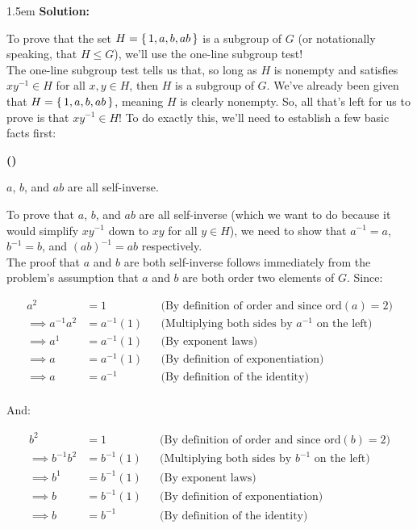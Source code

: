 \documentclass{article}
\newenvironment{solution}{
	\vspace{.5em}
	\par
	\begin{adjustwidth}{1.5em}{}
	\textbf{{Solution:}}
	\par
	\vspace{.5em}
}{
	\vspace{1em}
	\end{adjustwidth}
	\setcounter{step}{0}
	\newpage
}
\newcounter{step}
\renewcommand{\thestep}{\Roman{step}}
\newenvironment{step}{
	\refstepcounter{step}
	\vspace{1em}\par\noindent
	\ignorespaces\noindent\textbf{(\thestep)}
	\ignorespaces
}{
	\par
	\vspace{1.5em}
}
\newcounter{problem}
\newcommand{\ord}[1]{\text{ord}({#1})}
\begin{document}
\begin{solution}
	To prove that the set $H = \set{1, a, b, ab}$ is a subgroup of $G$ (or notationally speaking, that $H \le G$), we'll use the one-line subgroup test! \\

	The one-line subgroup test tells us that, so long as $H$ is nonempty and satisfies $xy^{-1} \in H$ for all $x, y \in H$, then $H$ is a subgroup of $G$. We've already been given that $H = \set{1, a, b, ab}$, meaning $H$ is clearly nonempty. So, all that's left for us to prove is that $xy^{-1} \in H$! To do exactly this, we'll need to establish a few basic facts first:

	\begin{step}
		$a$, $b$, and $ab$ are all self-inverse.
	\end{step}

	To prove that $a$, $b$, and $ab$ are all self-inverse (which we want to do because it would simplify $xy^{-1}$ down to $xy$ for all $y \in H$), we need to show that $a^{-1} = a$, $b^{-1} = b$, and $(ab)^{-1} = ab$ respectively. \\

	The proof that $a$ and $b$ are both self-inverse follows immediately from the problem's assumption that $a$ and $b$ are both order two elements of $G$. Since:

	\begin{align*}
		a^{2} &= 1 &&\text{(By definition of order and since $\ord{a} = 2$)} \\
		\implies a^{-1}a^{2} &= a^{-1}(1) &&\text{(Multiplying both sides by $a^{-1}$ on the left)} \\
		\implies a^{1} &= a^{-1}(1) &&\text{(By exponent laws)} \\
		\implies a &= a^{-1}(1) &&\text{(By definition of exponentiation)} \\
		\implies a &= a^{-1} &&\text{(By definition of the identity)} \\
	\end{align*}

	And:

	\begin{align*}
		b^{2} &= 1 &&\text{(By definition of order and since $\ord{b} = 2$)} \\
		\implies b^{-1}b^{2} &= b^{-1}(1) &&\text{(Multiplying both sides by $b^{-1}$ on the left)} \\
		\implies b^{1} &= b^{-1}(1) &&\text{(By exponent laws)} \\
		\implies b &= b^{-1}(1) &&\text{(By definition of exponentiation)} \\
		\implies b &= b^{-1} &&\text{(By definition of the identity)} \\
	\end{align*}


\end{solution}
\end{document}
